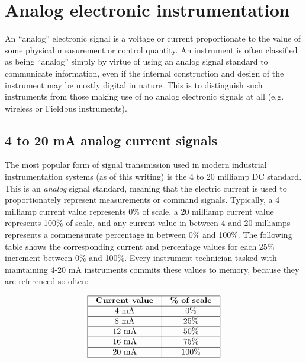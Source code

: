 
\chapter{Analog electronic instrumentation}

An ``analog'' electronic signal is a voltage or current proportionate to the value of some physical measurement or control quantity.  An instrument is often classified as being ``analog'' simply by virtue of using an analog signal standard to communicate information, even if the internal construction and design of the instrument may be mostly digital in nature.  This is to distinguish such instruments from those making use of no analog electronic signals at all (e.g. wireless or Fieldbus instruments).

\section{4 to 20 mA analog current signals}

The most popular form of signal transmission used in modern industrial instrumentation systems (as of this writing) is the 4 to 20 milliamp DC standard.  This is an \textit{analog} signal standard, meaning that the electric current is used to proportionately represent measurements or command signals.  Typically, a 4 milliamp current value represents 0\% of scale, a 20 milliamp current value represents 100\% of scale, and any current value in between 4 and 20 milliamps represents a commensurate percentage in between 0\% and 100\%.  The following table shows the corresponding current and percentage values for each 25\% increment between 0\% and 100\%.  Every instrument technician tasked with maintaining 4-20 mA instruments commits these values to memory, because they are referenced so often: 


$$\vbox{\offinterlineskip
\halign{\strut
\vrule \quad\hfil # \ \hfil & 
\vrule \quad\hfil # \ \hfil \vrule \cr
\noalign{\hrule}
%
\textbf{Current value} & \textbf{\% of scale} \cr
%
\noalign{\hrule}
%
4 mA & 0\% \cr
%
\noalign{\hrule}
%
8 mA & 25\% \cr
%
\noalign{\hrule}
%
12 mA & 50\% \cr
%
\noalign{\hrule}
%
16 mA & 75\% \cr
%
\noalign{\hrule}
%
20 mA & 100\% \cr
%
\noalign{\hrule}
} %
}$$ %

